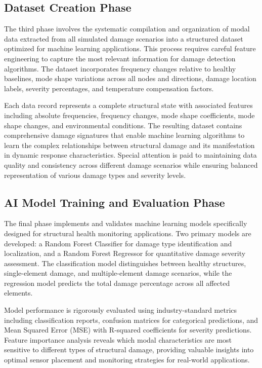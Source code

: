 \documentclass[11pt,a4paper]{article}
\begin{document}
\subsection{Dataset Creation Phase}

The third phase involves the systematic compilation and organization of modal data extracted from all simulated damage scenarios into a structured dataset optimized for machine learning applications. This process requires careful feature engineering to capture the most relevant information for damage detection algorithms. The dataset incorporates frequency changes relative to healthy baselines, mode shape variations across all nodes and directions, damage location labels, severity percentages, and temperature compensation factors.

Each data record represents a complete structural state with associated features including absolute frequencies, frequency changes, mode shape coefficients, mode shape changes, and environmental conditions. The resulting dataset contains comprehensive damage signatures that enable machine learning algorithms to learn the complex relationships between structural damage and its manifestation in dynamic response characteristics. Special attention is paid to maintaining data quality and consistency across different damage scenarios while ensuring balanced representation of various damage types and severity levels.

\subsection{AI Model Training and Evaluation Phase}

The final phase implements and validates machine learning models specifically designed for structural health monitoring applications. Two primary models are developed: a Random Forest Classifier for damage type identification and localization, and a Random Forest Regressor for quantitative damage severity assessment. The classification model distinguishes between healthy structures, single-element damage, and multiple-element damage scenarios, while the regression model predicts the total damage percentage across all affected elements.

Model performance is rigorously evaluated using industry-standard metrics including classification reports, confusion matrices for categorical predictions, and Mean Squared Error (MSE) with R-squared coefficients for severity predictions. Feature importance analysis reveals which modal characteristics are most sensitive to different types of structural damage, providing valuable insights into optimal sensor placement and monitoring strategies for real-world applications.
\end{document}
